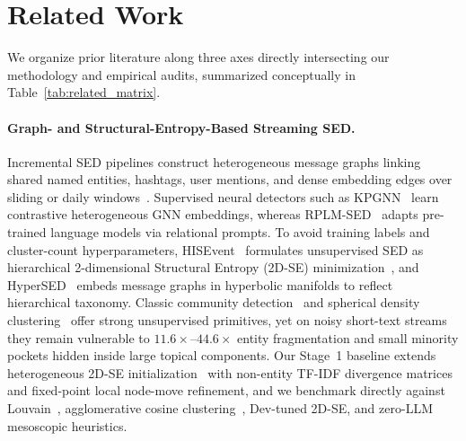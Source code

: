 \section{Related Work}
\label{sec:related}

We organize prior literature along three axes directly intersecting our methodology and empirical audits, summarized conceptually in Table~\ref{tab:related_matrix}.

\paragraph{Graph- and Structural-Entropy-Based Streaming SED.}
Incremental SED pipelines construct heterogeneous message graphs linking shared named entities, hashtags, user mentions, and dense embedding edges over sliding or daily windows~\citep{mcminn2013building,mazoyer2020french}. Supervised neural detectors such as KPGNN~\citep{cao2021kpgnn} learn contrastive heterogeneous GNN embeddings, whereas RPLM-SED~\citep{li2024rplmsed} adapts pre-trained language models via relational prompts. To avoid training labels and cluster-count hyperparameters, HISEvent~\citep{cao2024hisevent} formulates unsupervised SED as hierarchical 2-dimensional Structural Entropy (2D-SE) minimization~\citep{li2016structural}, and HyperSED~\citep{yu2025hypersed} embeds message graphs in hyperbolic manifolds to reflect hierarchical taxonomy. Classic community detection~\citep{blondel2008fast} and spherical density clustering~\citep{banerjee2005clustering,gonzalez1985clustering} offer strong unsupervised primitives, yet on noisy short-text streams they remain vulnerable to $11.6\times$--$44.6\times$ entity fragmentation and small minority pockets hidden inside large topical components. Our Stage~1 baseline extends heterogeneous 2D-SE initialization~\citep{cao2024hisevent} with non-entity TF-IDF divergence matrices and fixed-point local node-move refinement, and we benchmark directly against Louvain~\citep{blondel2008fast}, agglomerative cosine clustering~\citep{pedregosa2011scikit}, Dev-tuned 2D-SE, and zero-LLM mesoscopic heuristics.

